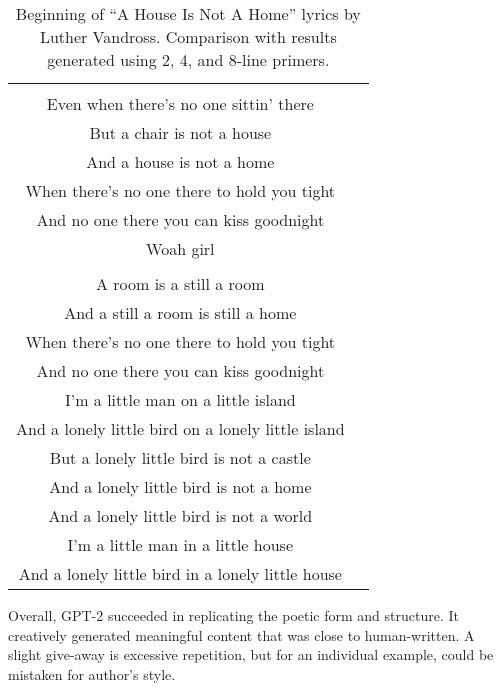 \begin{table}[!h]
\begin{tabular}{cc}
\begin{minipage}[t]{0.47\textwidth}
	 A chair is still a chair\\
	 Even when there's no one sittin' there\\
	 But a chair is not a house\\
	 And a house is not a home\\
	 When there's no one there to hold you tight\\
	 And no one there you can kiss goodnight\\
	 Woah girl\\
	 \\
	 A room is a still a room\\
	 \color{blue} And a still a room is still a home\\
	 When there's no one there to hold you tight\\
	 And no one there you can kiss goodnight\\
	 I'm a little man on a little island\\
	 And a lonely little bird on a lonely little island\\	 
	 But a lonely little bird is not a castle\\
	 And a lonely little bird is not a home\\
	 And a lonely little bird is not a world\\
	 I'm a little man in a little house\\
	 And a lonely little bird in a lonely little house
	 \end{minipage}\\[6pt]
	\end{tabular}
	\caption{Beginning of ``A House Is Not A Home'' lyrics by Luther Vandross. Comparison with results generated using 2, 4, and 8-line primers.}
	\label{generation_result}
\end{table}


Overall, GPT-2 succeeded in replicating the poetic form and structure. It creatively generated meaningful content that was  close to human-written. A slight give-away is excessive repetition, but for an individual example,  could be mistaken for author's style.
